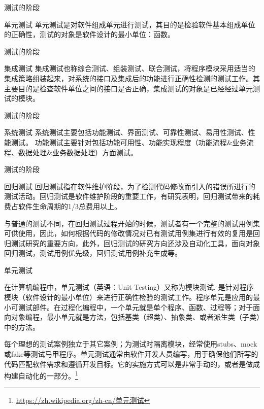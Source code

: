 \documentclass{beamer}
\begin{document}
\begin{frame}[t]{测试的阶段}
    \begin{block}
        {单元测试}
单元测试是对软件组成单元进行测试，其目的是检验软件基本组成单位的正确性，测试的对象是软件设计的最小单位：函数。
    \end{block}


    
\end{frame}
\begin{frame}[t]{测试的阶段}
    
    \begin{block}{集成测试}
    集成测试也称综合测试、组装测试、联合测试，将程序模块采用适当的集成策略组装起来，对系统的接口及集成后的功能进行正确性检测的测试工作。其主要目的是检查软件单位之间的接口是否正确，集成测试的对象是已经经过单元测试的模块。
    \end{block}
\end{frame}
\begin{frame}[t]{测试的阶段}
    
    \begin{block}{系统测试}
    系统测试主要包括功能测试、界面测试、可靠性测试、易用性测试、性能测试。 功能测试主要针对包括功能可用性、功能实现程度（功能流程\&业务流程、数据处理\&业务数据处理）方面测试。
    \end{block}
\end{frame}
\begin{frame}[t]{测试的阶段}
    
    \begin{block}{回归测试}
回归测试指在软件维护阶段，为了检测代码修改而引入的错误所进行的测试活动。回归测试是软件维护阶段的重要工作，有研究表明，回归测试带来的耗费占软件生命周期的1/3总费用以上。

与普通的测试不同，在回归测试过程开始的时候，测试者有一个完整的测试用例集可供使用，因此，如何根据代码的修改情况对已有测试用例集进行有效的复用是回归测试研究的重要方向，此外，回归测试的研究方向还涉及自动化工具，面向对象回归测试，测试用例优先级，回归测试用例补充生成等。
\end{block}
\end{frame}
\begin{frame}[t]{单元测试}
    	

在计算机编程中，单元测试（英语：Unit Testing）又称为模块测试, 是针对程序模块（软件设计的最小单位）来进行正确性检验的测试工作。程序单元是应用的最小可测试部件。在过程化编程中，一个单元就是单个程序、函数、过程等；对于面向对象编程，最小单元就是方法，包括基类（超类）、抽象类、或者派生类（子类）中的方法。


每个理想的测试案例独立于其它案例；为测试时隔离模块，经常使用stubs、mock或fake等测试马甲程序。单元测试通常由软件开发人员编写，用于确保他们所写的代码匹配软件需求和遵循开发目标。它的实施方式可以是非常手动的，或者是做成构建自动化的一部分。\footnote{\url{https://zh.wikipedia.org/zh-cn/单元测试}}
\end{frame}
\end{document}

